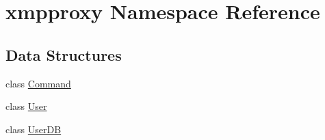 \hypertarget{namespacexmpproxy}{
\section{xmpproxy \-Namespace \-Reference}
\label{namespacexmpproxy}
}
\subsection*{\-Data \-Structures}
\begin{DoxyCompactItemize}
\item 
class \hyperlink{classxmpproxy_1_1_command}{\-Command}
\item 
class \hyperlink{classxmpproxy_1_1_user}{\-User}
\item 
class \hyperlink{classxmpproxy_1_1_user_d_b}{\-User\-D\-B}
\end{DoxyCompactItemize}
